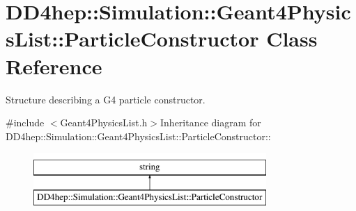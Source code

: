\hypertarget{class_d_d4hep_1_1_simulation_1_1_geant4_physics_list_1_1_particle_constructor}{
\section{DD4hep::Simulation::Geant4PhysicsList::ParticleConstructor Class Reference}
\label{class_d_d4hep_1_1_simulation_1_1_geant4_physics_list_1_1_particle_constructor}
}


Structure describing a G4 particle constructor.  


{\ttfamily \#include $<$Geant4PhysicsList.h$>$}Inheritance diagram for DD4hep::Simulation::Geant4PhysicsList::ParticleConstructor::\begin{figure}[H]
\begin{center}
\leavevmode
\includegraphics[height=2cm]{class_d_d4hep_1_1_simulation_1_1_geant4_physics_list_1_1_particle_constructor}
\end{center}
\end{figure}
